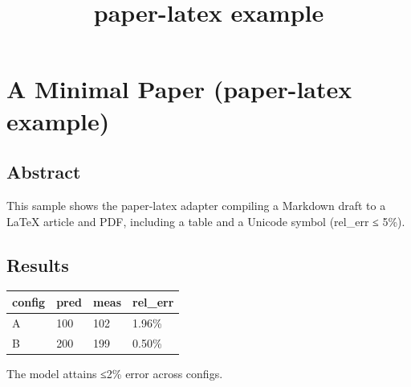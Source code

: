 \documentclass[
]{article}
\title{paper-latex example}
\author{}
\date{}
\newcounter{none} %
\begin{document}
\maketitle

{
\setcounter{tocdepth}{2}
\tableofcontents
}
\section{A Minimal Paper (paper-latex
example)}\label{a-minimal-paper-paper-latex-example}

\subsection{Abstract}\label{abstract}

This sample shows the paper-latex adapter compiling a Markdown draft to
a LaTeX article and PDF, including a table and a Unicode symbol
(rel\_err ≤ 5\%).

\subsection{Results}\label{results}

{\def\LTcaptype{none} %
\begin{longtable}[]{@{}llll@{}}
\toprule\noalign{}
config & pred & meas & rel\_err \\
\midrule\noalign{}
\endhead
\bottomrule\noalign{}
\endlastfoot
A & 100 & 102 & 1.96\% \\
B & 200 & 199 & 0.50\% \\
\end{longtable}
}

The model attains ≤2\% error across configs.
\end{document}
